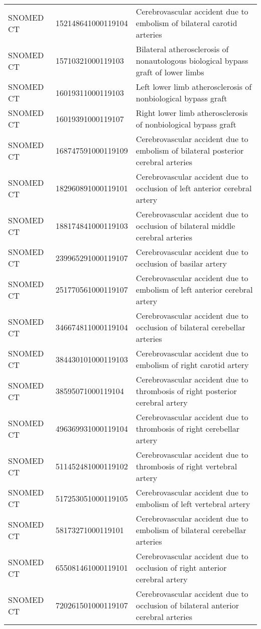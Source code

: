 \begin{longtable}{p{}p{}p{}}
  SNOMED CT & 152148641000119104 & Cerebrovascular accident due to embolism of bilateral carotid arteries \\ 
  SNOMED CT & 15710321000119103 & Bilateral atherosclerosis of nonautologous biological bypass graft of lower limbs \\ 
  SNOMED CT & 16019311000119103 & Left lower limb atherosclerosis of nonbiological bypass graft \\ 
  SNOMED CT & 16019391000119107 & Right lower limb atherosclerosis of nonbiological bypass graft \\ 
  SNOMED CT & 168747591000119109 & Cerebrovascular accident due to embolism of bilateral posterior cerebral arteries \\ 
  SNOMED CT & 182960891000119101 & Cerebrovascular accident due to occlusion of left anterior cerebral artery \\ 
  SNOMED CT & 188174841000119103 & Cerebrovascular accident due to occlusion of bilateral middle cerebral arteries \\ 
  SNOMED CT & 239965291000119107 & Cerebrovascular accident due to occlusion of basilar artery \\ 
  SNOMED CT & 251770561000119107 & Cerebrovascular accident due to embolism of left anterior cerebral artery \\ 
  SNOMED CT & 346674811000119104 & Cerebrovascular accident due to occlusion of bilateral cerebellar arteries \\ 
  SNOMED CT & 384430101000119103 & Cerebrovascular accident due to embolism of right carotid artery \\ 
  SNOMED CT & 38595071000119104 & Cerebrovascular accident due to thrombosis of right posterior cerebral artery \\ 
  SNOMED CT & 496369931000119104 & Cerebrovascular accident due to thrombosis of right cerebellar artery \\ 
  SNOMED CT & 511452481000119102 & Cerebrovascular accident due to thrombosis of right vertebral artery \\ 
  SNOMED CT & 517253051000119105 & Cerebrovascular accident due to embolism of left vertebral artery \\ 
  SNOMED CT & 58173271000119101 & Cerebrovascular accident due to embolism of bilateral cerebellar arteries \\ 
  SNOMED CT & 655081461000119101 & Cerebrovascular accident due to occlusion of right anterior cerebral artery \\ 
  SNOMED CT & 720261501000119107 & Cerebrovascular accident due to occlusion of bilateral anterior cerebral arteries \\ 

\end{longtable}
